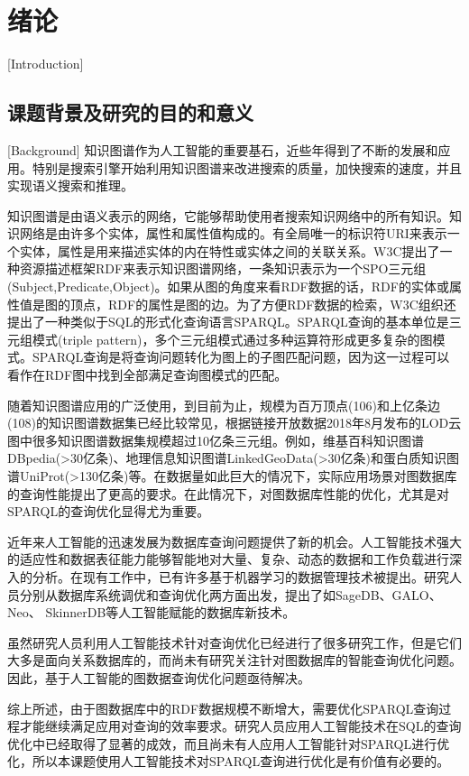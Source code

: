 
\chapter{绪论}[Introduction]

\section{课题背景及研究的目的和意义}[Background]
知识图谱作为人工智能的重要基石，近些年得到了不断的发展和应用。特别是搜索引擎开始利用知识图谱来改进搜索的质量，加快搜索的速度，并且实现语义搜索和推理。

知识图谱是由语义表示的网络，它能够帮助使用者搜索知识网络中的所有知识。知识网络是由许多个实体，属性和属性值构成的。有全局唯一的标识符URI来表示一个实体，属性是用来描述实体的内在特性或实体之间的关联关系。W3C提出了一种资源描述框架RDF\cite{rdf}来表示知识图谱网络，一条知识表示为一个SPO三元组(Subject,Predicate,Object)。如果从图的角度来看RDF数据的话，RDF的实体或属性值是图的顶点，RDF的属性是图的边。为了方便RDF数据的检索，W3C组织还提出了一种类似于SQL的形式化查询语言SPARQL\cite{sparql}。SPARQL查询的基本单位是三元组模式(triple pattern)，多个三元组模式通过多种运算符形成更多复杂的图模式。SPARQL查询是将查询问题转化为图上的子图匹配问题，因为这一过程可以看作在RDF图中找到全部满足查询图模式的匹配。

随着知识图谱应用的广泛使用，到目前为止，规模为百万顶点(106)和上亿条边(108)的知识图谱数据集已经比较常见\cite{MassiveData}，根据链接开放数据2018年8月发布的LOD云图中很多知识图谱数据集规模超过10亿条三元组。例如，维基百科知识图谱DBpedia(>30亿条)、地理信息知识图谱LinkedGeoData(>30亿条)和蛋白质知识图谱UniProt(>130亿条)等。在数据量如此巨大的情况下，实际应用场景对图数据库的查询性能提出了更高的要求。在此情况下，对图数据库性能的优化，尤其是对SPARQL的查询优化显得尤为重要。

近年来人工智能的迅速发展为数据库查询问题提供了新的机会\cite{MLforDB}。人工智能技术强大的适应性和数据表征能力能够智能地对大量、复杂、动态的数据和工作负载进行深入的分析。在现有工作中，已有许多基于机器学习的数据管理技术被提出。研究人员分别从数据库系统调优和查询优化两方面出发，提出了如SageDB\cite{SageDB}、GALO\cite{GALO}、Neo\cite{Neo}、
SkinnerDB\cite{SkinnerDB}等人工智能赋能的数据库新技术。

虽然研究人员利用人工智能技术针对查询优化已经进行了很多研究工作，但是它们大多是面向关系数据库的，而尚未有研究关注针对图数据库的智能查询优化问题。因此，基于人工智能的图数据查询优化问题亟待解决。

综上所述，由于图数据库中的RDF数据规模不断增大，需要优化SPARQL查询过程才能继续满足应用对查询的效率要求。研究人员应用人工智能技术在SQL的查询优化中已经取得了显著的成效，而且尚未有人应用人工智能针对SPARQL进行优化，所以本课题使用人工智能技术对SPARQL查询进行优化是有价值有必要的。


